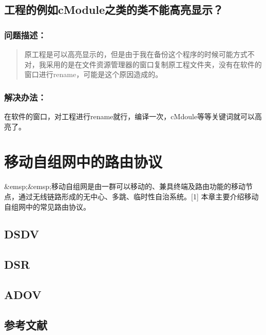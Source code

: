 \section{工程的例如cModule之类的类不能高亮显示？}
\label{工程的例如cmodule之类的类不能高亮显示？}

\subsection{问题描述：}
\label{问题描述：}

\begin{quote}
原工程是可以高亮显示的，但是由于我在备份这个程序的时候可能方式不对，我采用的是在文件资源管理器的窗口复制原工程文件夹，没有在软件的窗口进行rename，可能是这个原因造成的。
\end{quote}

\subsection{解决办法：}
\label{解决办法：}

在软件的窗口，对工程进行rename就行，编译一次，cMdoule等等关键词就可以高亮了。

\chapter{移动自组网中的路由协议}
\label{移动自组网中的路由协议}

\&emsp;\&emsp;移动自组网是由一群可以移动的、兼具终端及路由功能的移动节点，通过无线链路形成的无中心、多跳、临时性自治系统。{[1]}
本章主要介绍移动自组网中的常见路由协议。

\section{DSDV}
\label{dsdv}

\section{DSR}
\label{dsr}

\section{ADOV}
\label{adov}

\section{参考文献}
\label{参考文献}


